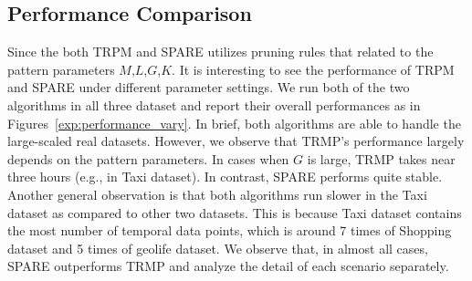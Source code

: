 \subsection{Performance Comparison}
Since the both TRPM and SPARE utilizes pruning rules that related to the 
pattern parameters $M$,$L$,$G$,$K$. It is interesting to
see the performance of TRPM and SPARE under different parameter settings.
%
We run both of the two algorithms in all three dataset and report
their overall performances as in Figures~\ref{exp:performance_vary}.
In brief, both algorithms are able to handle the large-scaled real
datasets. However, we observe that TRMP's performance largely depends
on the pattern parameters. In cases when $G$ is large, 
TRMP takes near three hours (e.g., in Taxi dataset).
In contrast, SPARE performs quite stable. Another general observation
is that both algorithms run slower in the Taxi dataset as compared to
other two datasets. This is because Taxi dataset contains
the most number of temporal data points, which is around 7 times of Shopping
dataset and 5 times of geolife dataset. We observe that, 
in almost all cases, SPARE outperforms TRMP and analyze the detail
of each scenario separately.

